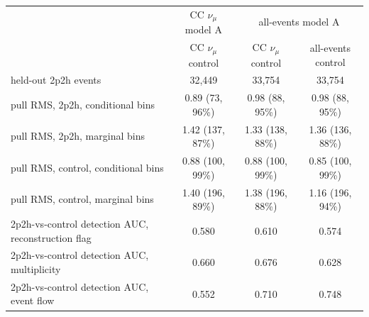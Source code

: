 \begin{tabular}{lccc}
\toprule
 & CC $\nu_\mu$ model A & \multicolumn{2}{c}{all-events model A} \\
 & CC $\nu_\mu$ control & CC $\nu_\mu$ control & all-events control \\
\midrule
held-out 2p2h events & 32,449 & 33,754 & 33,754 \\
pull RMS, 2p2h, conditional bins & 0.89 (73, 96\%) & 0.98 (88, 95\%) & 0.98 (88, 95\%) \\
pull RMS, 2p2h, marginal bins & 1.42 (137, 87\%) & 1.33 (138, 88\%) & 1.36 (136, 88\%) \\
pull RMS, control, conditional bins & 0.88 (100, 99\%) & 0.88 (100, 99\%) & 0.85 (100, 99\%) \\
pull RMS, control, marginal bins & 1.40 (196, 89\%) & 1.38 (196, 88\%) & 1.16 (196, 94\%) \\
\midrule
2p2h-vs-control detection AUC, reconstruction flag & 0.580 & 0.610 & 0.574 \\
2p2h-vs-control detection AUC, multiplicity & 0.660 & 0.676 & 0.628 \\
2p2h-vs-control detection AUC, event flow & 0.552 & 0.710 & 0.748 \\
\bottomrule
\end{tabular}
